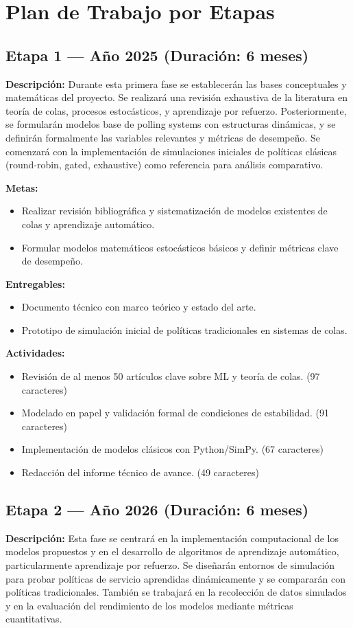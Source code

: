 \documentclass[12pt]{article}
\begin{document}
\section{Plan de Trabajo por Etapas}

\subsection*{Etapa 1 — Año 2025 (Duración: 6 meses)}
\textbf{Descripción:} Durante esta primera fase se establecerán las bases conceptuales y matemáticas del proyecto. Se realizará una revisión exhaustiva de la literatura en teoría de colas, procesos estocásticos, y aprendizaje por refuerzo. Posteriormente, se formularán modelos base de polling systems con estructuras dinámicas, y se definirán formalmente las variables relevantes y métricas de desempeño. Se comenzará con la implementación de simulaciones iniciales de políticas clásicas (round-robin, gated, exhaustive) como referencia para análisis comparativo.

\textbf{Metas:}
\begin{itemize}
  \item Realizar revisión bibliográfica y sistematización de modelos existentes de colas y aprendizaje automático.
  \item Formular modelos matemáticos estocásticos básicos y definir métricas clave de desempeño.
\end{itemize}

\textbf{Entregables:}
\begin{itemize}
  \item Documento técnico con marco teórico y estado del arte.
  \item Prototipo de simulación inicial de políticas tradicionales en sistemas de colas.
\end{itemize}

\textbf{Actividades:}
\begin{itemize}
  \item Revisión de al menos 50 artículos clave sobre ML y teoría de colas. (97 caracteres)
  \item Modelado en papel y validación formal de condiciones de estabilidad. (91 caracteres)
  \item Implementación de modelos clásicos con Python/SimPy. (67 caracteres)
  \item Redacción del informe técnico de avance. (49 caracteres)
\end{itemize}

\subsection*{Etapa 2 — Año 2026 (Duración: 6 meses)}
\textbf{Descripción:} Esta fase se centrará en la implementación computacional de los modelos propuestos y en el desarrollo de algoritmos de aprendizaje automático, particularmente aprendizaje por refuerzo. Se diseñarán entornos de simulación para probar políticas de servicio aprendidas dinámicamente y se compararán con políticas tradicionales. También se trabajará en la recolección de datos simulados y en la evaluación del rendimiento de los modelos mediante métricas cuantitativas.
\end{document}
